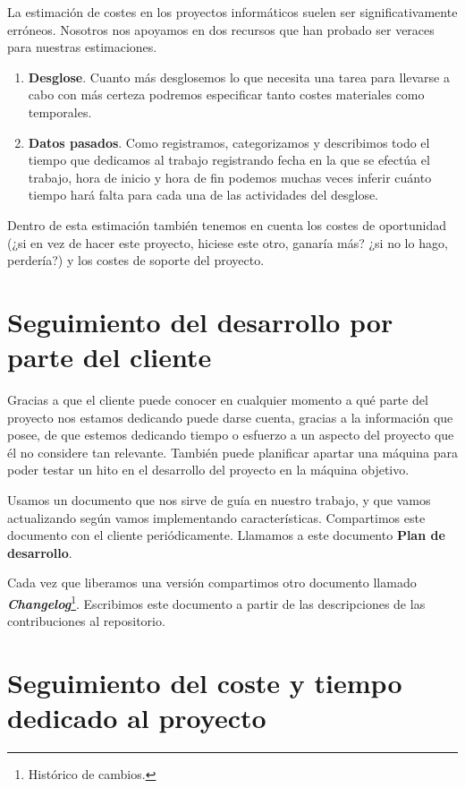 La estimación de costes en los proyectos informáticos suelen
ser significativamente erróneos. Nosotros nos apoyamos en dos
recursos que han probado ser veraces para nuestras estimaciones.

\begin{enumerate}
    \item \textbf{Desglose}. Cuanto más desglosemos lo que
          necesita una tarea para llevarse a cabo con más
          certeza podremos especificar tanto costes materiales
          como temporales.
    \item \textbf{Datos pasados}. Como registramos, categorizamos
          y describimos todo el tiempo que dedicamos al trabajo
          registrando fecha en la que se efectúa el trabajo, hora
          de inicio y hora de fin podemos muchas veces inferir
          cuánto tiempo hará falta para cada una de las actividades
          del desglose.
\end{enumerate}

Dentro de esta estimación también tenemos en cuenta los costes de
oportunidad (¿si en vez de hacer este proyecto, hiciese este otro,
ganaría más? ¿si no lo hago, perdería?) y los costes de soporte del proyecto.

\section{Seguimiento del desarrollo por parte del cliente}

Gracias a que el cliente puede conocer en cualquier momento a qué 
parte del proyecto nos estamos dedicando puede darse cuenta,
gracias a la información que posee, de que estemos dedicando tiempo
o esfuerzo a un aspecto del proyecto que él no considere tan
relevante. También puede planificar apartar una máquina para poder
testar un hito en el desarrollo del proyecto en la máquina objetivo.

Usamos un documento que nos sirve de guía en nuestro trabajo, y que
vamos actualizando según vamos implementando características.
Compartimos este documento con el cliente periódicamente.
Llamamos a este documento \textbf{Plan de desarrollo}.

Cada vez que liberamos una versión compartimos otro documento llamado
\textit{\textbf{Changelog}}\footnote{Histórico de cambios.}. Escribimos
este documento a partir de las descripciones de las contribuciones al
repositorio.

\section{Seguimiento del coste y tiempo dedicado al proyecto}

